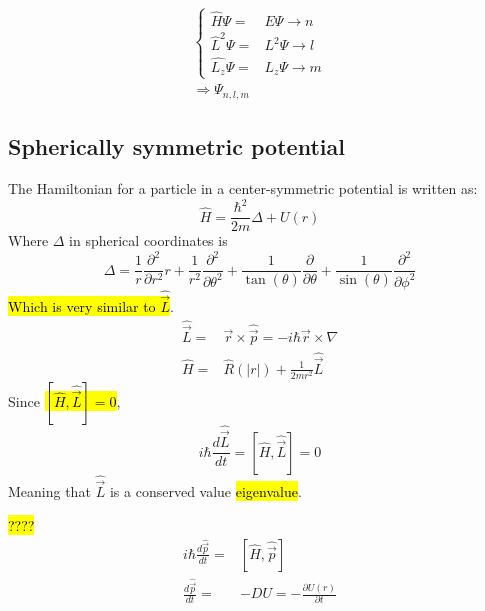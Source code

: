 	\begin{align}
		\left\{ \begin{aligned}
			\hat{H} \Psi =& E \Psi \rightarrow n\\
			\hat{L}^2 \Psi =& L^2 \Psi \rightarrow l \\
			\hat{L_z} \Psi =& L_z \Psi  \rightarrow m
		\end{aligned} \right. \\
		\Rightarrow \Psi_{n,l,m}
	\end{align}
	\subsection{Spherically symmetric potential}
		The Hamiltonian for a particle in a center-symmetric potential is written as:
		\begin{equation}
			\hat{H} = \frac{\hbar^2}{2m}\Delta + U(r)
		\end{equation}
		Where $\Delta$ in spherical coordinates is
		\begin{equation}
			\Delta = \frac{1}{r}\frac{\partial^2}{\partial r ^2}r + \frac{1}{r^2} \frac{\partial^2}{\partial \theta^2} + \frac{1}{\tan(\theta)}\frac{\partial}{\partial \theta} + \frac{1}{\sin(\theta)}\frac{\partial^2}{\partial \phi^2}
		\end{equation}
		\hl{Which is very similar to $\hat{\vec{L}}$}.
		\begin{align}
			\hat{\vec{L}} =& \vec{r}\times\hat{\vec{p}} = -i\hbar\vec{r}\times\nabla \\
			\hat{H} =& \hat{R}(|r|) + \frac{1}{2m r^2}\hat{\vec{L}}
		\end{align}
		Since \hl{$\left[\hat{H}, \hat{\vec{L}}\right] = 0$},
		\begin{equation}
			i\hbar\frac{d\hat{\vec{L}}}{dt} = \left[\hat{H}, \hat{\vec{L}}\right] = 0
		\end{equation}
		Meaning that $\hat{\vec{L}}$ is a conserved value \hl{eigenvalue}.
		
		\hl{????}
		\begin{align}
			i\hbar\frac{d\hat{\vec{p}}}{dt} =& \left[\hat{H}, \hat{\vec{p}}\right] \\
			\frac{d\hat{\vec{p}}}{dt} =& -DU = -\frac{\partial U(r)}{\partial t}
		\end{align}
		
